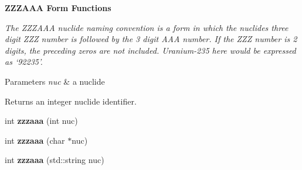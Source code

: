 \begin{Indent}{\bf Z\-Z\-Z\-A\-A\-A Form Functions}\par
{\em The Z\-Z\-Z\-A\-A\-A nuclide naming convention is a form in which the nuclides three digit Z\-Z\-Z number is followed by the 3 digit A\-A\-A number. If the Z\-Z\-Z number is 2 digits, the preceding zeros are not included. Uranium-\/235 here would be expressed as ‘92235’. 
\begin{DoxyParams}{Parameters}
{\em nuc} & a nuclide \\
\hline
\end{DoxyParams}
\begin{DoxyReturn}{Returns}
an integer nuclide identifier. 
\end{DoxyReturn}
}\begin{DoxyCompactItemize}
\item 
\hypertarget{namespacepyne_1_1nucname_a2f94ab045f7240ac0138fd8c312408ba}{int {\bfseries zzzaaa} (int nuc)}\label{namespacepyne_1_1nucname_a2f94ab045f7240ac0138fd8c312408ba}

\item 
\hypertarget{namespacepyne_1_1nucname_a24f3c3ce13d92aec6718b2b00096f6c3}{int {\bfseries zzzaaa} (char $\ast$nuc)}\label{namespacepyne_1_1nucname_a24f3c3ce13d92aec6718b2b00096f6c3}

\item 
\hypertarget{namespacepyne_1_1nucname_aff15f31b4762adb2707c267e9e07b9ac}{int {\bfseries zzzaaa} (std\-::string nuc)}\label{namespacepyne_1_1nucname_aff15f31b4762adb2707c267e9e07b9ac}

\end{DoxyCompactItemize}
\end{Indent}

